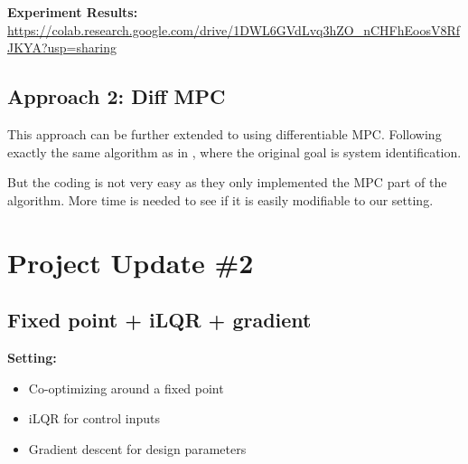 \documentclass[conference]{IEEEtran}
\begin{document}
\textbf{Experiment Results:} \url{https://colab.research.google.com/drive/1DWL6GVdLvq3hZO_nCHFhEoosV8RfJKYA?usp=sharing}





\subsection{Approach 2: Diff MPC\cite{amos2018differentiable}}

This approach can be further extended to using differentiable MPC. Following exactly the same algorithm as in \cite{amos2018differentiable}, where the original goal is system identification.


But the coding is not very easy as they only implemented the MPC part of the algorithm. More time is needed to see if it is easily modifiable to our setting.


\section{Project Update \#2}


\subsection{Fixed point + iLQR + gradient}


\textbf{Setting:}
\vspace{-5pt}
\begin{itemize}
    \setlength{\itemsep}{0pt}
    \setlength{\parsep}{0pt}
    \setlength{\parskip}{0pt}
    \item Co-optimizing around a fixed point
    \item iLQR for control inputs
    \item Gradient descent for design parameters
\end{itemize}
\end{document}

